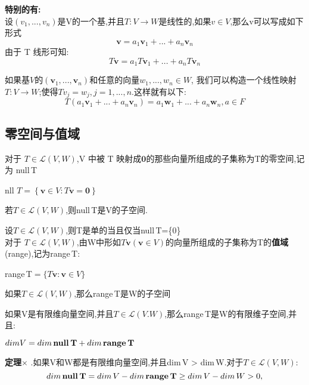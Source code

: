 {\bfseries 特别的有:}\\
设$(v_1,...,v_n)$是V的一个基,并且$T:V\to W$是线性的,如果$v\in V$,那么v可以写成如下形式
        $$
\textbf{v}=a_1\textbf{v}_1+...+a_n\textbf{v}_n
        $$
由于 T 线形可知:
        $$
T\textbf{v}=a_1T\textbf{v}_1+...+a_nT\textbf{v}_n
        $$

如果基$V的(\textbf{v}_1,...,\textbf{v}_n)$和任意的向量$w_1,...,w_n\in W$,
我们可以构造一个线性映射$T:V\to W$;使得$Tv_j=w_j,j=1,...,n.$这样就有以下:
$$
T(a_1\textbf{v}_1+...+a_n\textbf{v}_n)=a_1\textbf{w}_1+...+a_n\textbf{w}_n,a\in F
$$
\subsection{零空间与值域}

对于 $T\in \mathcal{L}(V,W)$,V 中被 T 映射成$\textbf{0}$的那些向量所组成的子集称为T的零空间,记为 null\,T
 
        \begin{center}
        nll $T=\left\{ \textbf{v}\in V:T\textbf{v}=\textbf{0}\right\}$
        \end{center}

\begin{definition}
        若$T\in \mathcal{L}(V,W)$,则null\,T是V的子空间.
\end{definition}

\begin{definition}
        设$T\in \mathcal{L}(V,W)$,则T是单的当且仅当null\,T=\{0\}\\
对于 $T\in \mathcal{L}(V,W)$,由W中形如$T\mathbf{v}(\mathbf{v}\in V)$的向量所组成的子集称为T的\textbf{值域}(range),记为range\,T:\\
        \begin{center}
        range\,T$=\{T\mathbf{v}:\mathbf{v} \in V\}$
        \end{center}
\end{definition}

\begin{definition}
        如果$T\in \mathcal{L}(V,W)$,那么range\,T是W的子空间
\end{definition}
\begin{definition}
        如果V是有限维向量空间,并且$T\in \mathcal{L}(V.W)$,那么range\,T是W的有限维子空间,并且:
        \begin{center}
               $ dimV =dim\,\textbf{null\,T}+dim\,\textbf{range\,T}$   
        \end{center}
\textbf{定理}$\times$ .\quad 如果V和W都是有限维向量空间,并且dim\,V > dim\,W.对于$T\in \mathcal{L}(V,W):$
$$dim\,\textbf{null\,T}=dim\,V-dim\,\textbf{range\,T}\\\geq dim\,V-dim\,W\\>0,$$

\end{definition}

